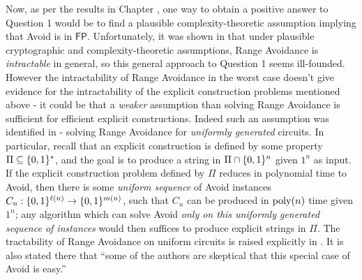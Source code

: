 Now, as per the results in Chapter , one way to obtain a positive answer to Question 1 would be to find a plausible complexity-theoretic assumption implying that Avoid is in $\mathsf{FP}$. Unfortunately,  it was shown in \cite{ILW23} that under plausible cryptographic and complexity-theoretic assumptions, Range Avoidance is {\it intractable} in general, so this general approach to Question 1 seems ill-founded. 
However the intractability of Range Avoidance in the worst case doesn't give evidence for the intractability of the explicit construction problems mentioned above - it could be that a {\it weaker} assumption than solving Range Avoidance is sufficient for efficient explicit constructions. Indeed such an assumption was identified in \cite{ILW23} - solving Range Avoidance for {\it uniformly generated} circuits. In particular, recall that an explicit construction is defined by some property $\Pi \subseteq \{0,1\}^*$, and the goal is to produce a string in $\Pi \cap \{0,1\}^n$ given $1^n$ as input. If the explicit construction problem defined by $\Pi$ reduces in polynomial time to Avoid, then there is some \emph{uniform sequence} of Avoid instances $C_n: \{0,1\}^{\ell(n)} \to \{0,1\}^{m(n)}$, such that $C_n$ can be produced in $\mathrm{poly}(n)$ time given $1^n$; any algorithm which can solve Avoid \emph{only on this uniformly generated sequence of instances} would then suffices to produce explicit strings in $\Pi$. The tractability of Range Avoidance on uniform circuits is raised explicitly in \cite{ILW23}. It is also stated there that ``some of the authors are skeptical that this special case of Avoid is easy.''



